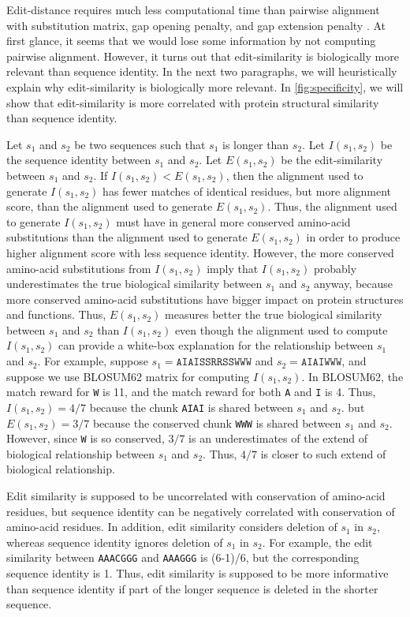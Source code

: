 \documentclass[11pt,letterpaper]{article}
\begin{document}
Edit-distance requires much less computational time than pairwise alignment with substitution matrix, gap opening penalty, and gap extension penalty \cite{vsovsic2017edlib}. 
At first glance, it seems that we would lose some information by not computing pairwise alignment. 
However, it turns out that edit-similarity is biologically more relevant than sequence identity.
In the next two paragraphs, we will heuristically explain why edit-similarity is biologically more relevant.
In \ref{fig:specificity}, we will show that edit-similarity is more correlated with protein structural similarity than sequence identity.

Let \(s_1\) and \(s_2\) be two sequences such that \(s_1\) is longer than \(s_2\).
Let \(I(s_1, s_2)\) be the sequence identity between \(s_1\) and \(s_2\).
Let \(E(s_1, s_2)\) be the edit-similarity between \(s_1\) and \(s_2\).
If \(I(s_1, s_2) < E(s_1, s_2)\), then the alignment used to generate \(I(s_1, s_2)\) has fewer matches of identical residues, but more alignment score, than the alignment used to generate \(E(s_1, s_2)\).
Thus, the alignment used to generate \(I(s_1, s_2)\) must have in general more conserved amino-acid substitutions than the alignment used to generate \(E(s_1, s_2)\) in order to produce higher alignment score with less sequence identity.
However, the more conserved amino-acid substitutions from \(I(s_1, s_2)\) imply that \(I(s_1, s_2)\) probably underestimates the true biological similarity between \(s_1\) and \(s_2\) anyway, because more conserved amino-acid substitutions have bigger impact on protein structures and functions.
Thus, \(E(s_1, s_2)\) measures better the true biological similarity between \(s_1\) and \(s_2\) than \(I(s_1, s_2)\) even though the alignment used to compute \(I(s_1, s_2)\) can provide a white-box explanation for the relationship between \(s_1\) and \(s_2\).
For example, suppose \(s_1 = \texttt{AIAISSRRSSWWW}\) and \(s_2 = \texttt{AIAIWWW}\), 
and suppose we use BLOSUM62 matrix for computing \(I(s_1, s_2)\).
In BLOSUM62, the match reward for \texttt{W} is 11, and the match reward for both \texttt{A} and \texttt{I} is 4.
Thus, \(I(s_1, s_2) = 4/7\) because the           chunk \texttt{AIAI} is shared between \(s_1\) and \(s_2\).
but \(E(s_1, s_2) = 3/7\) because the conserved chunk \texttt{WWW}  is shared between \(s_1\) and \(s_2\).
However, since \texttt{W} is so conserved, \(3/7\) is an underestimates of the extend of biological relationship between \(s_1\) and \(s_2\).
Thus, \(4/7\) is closer to such extend of biological relationship.

Edit similarity is supposed to be uncorrelated with conservation of amino-acid residues, but sequence identity can be negatively correlated with conservation of amino-acid residues.
In addition, edit similarity considers deletion of \(s_1\) in \(s_2\), whereas sequence identity ignores deletion of \(s_1\) in \(s_2\).
For example, the edit similarity between \texttt{AAACGGG} and \texttt{AAAGGG} is (6-1)/6, but the corresponding sequence identity is 1. Thus, edit similarity is supposed to be more informative than sequence identity if part of the longer sequence is deleted in the shorter sequence.

\fi
\end{document}

